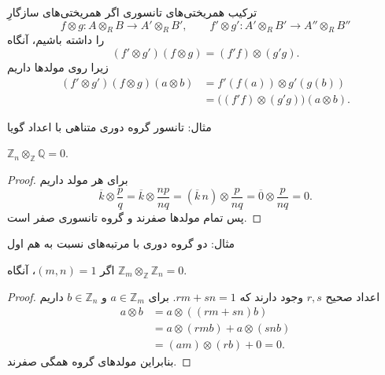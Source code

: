 \begin{frame}[t]{ترکیب همریختی‌های تانسوری}
    \label{lec19:composition}
    اگر همریختی‌های سازگارِ
    \[
        f\otimes g:A\otimes_R B\longrightarrow A'\otimes_R B',
        \qquad
        f'\otimes g':A'\otimes_R B'\longrightarrow A''\otimes_R B''
    \]
    را داشته باشیم، آنگاه
    \[
        (f'\otimes g')(f\otimes g)=(f'f)\otimes(g'g).
    \]
    زیرا روی مولدها داریم
    \[
    \begin{aligned}
        (f'\otimes g')(f\otimes g)(a\otimes b)
        &=f'(f(a))\otimes g'(g(b))\\
        &=\bigl((f'f)\otimes(g'g)\bigr)(a\otimes b).
    \end{aligned}
    \]
\end{frame}

\begin{frame}[t]{مثال: تانسور گروه دوری متناهی با اعداد گویا}
    \label{lec19:zn-tensor-q}
    \begin{example}
        $\mathbb Z_n\otimes_{\mathbb Z}\mathbb Q=0$.
    \end{example}
    \begin{proof}
    برای هر مولد داریم
    \[
        \overline k\otimes\frac pq
        =\overline k\otimes\frac{np}{nq}
        =(\overline k\,n)\otimes\frac{p}{nq}
        =\overline0\otimes\frac{p}{nq}=0.
    \]
    پس تمام مولدها صفرند و گروه تانسوری صفر است.
    \end{proof}
\end{frame}

\begin{frame}[t]{مثال: دو گروه دوری با مرتبه‌های نسبت به هم اول}
    \label{lec19:coprime-cyclic}
    \begin{example}
        اگر $(m,n)=1$، آنگاه $\mathbb Z_m\otimes_{\mathbb Z}\mathbb Z_n=0$.
    \end{example}
    \begin{proof}
    اعداد صحیح $r,s$ وجود دارند که $rm+sn=1$. برای $a\in\mathbb Z_m$
    و $b\in\mathbb Z_n$ داریم
    \[
    \begin{aligned}
        a\otimes b
        &=a\otimes((rm+sn)b)\\
        &=a\otimes(rmb)+a\otimes(snb)\\
        &=(am)\otimes(rb)+0=0.
    \end{aligned}
    \]
    بنابراین مولدهای گروه همگی صفرند.
    \end{proof}
\end{frame}

